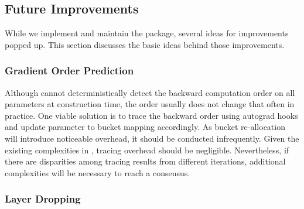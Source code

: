 \subsection{Future Improvements}

While we implement and maintain the  package, several ideas for improvements popped up. This section discusses the basic ideas behind those improvements. 



\subsubsection{Gradient Order Prediction}

Although  cannot deterministically detect the backward computation order on all parameters at construction time, the order usually does not change that often in practice. One viable solution is to trace the backward order using autograd hooks and update parameter to bucket mapping accordingly. As bucket re-allocation will introduce noticeable overhead, it should be conducted infrequently. Given the existing complexities in , tracing overhead should be negligible. Nevertheless, if there are disparities among tracing results from different iterations, additional complexities will be necessary to reach a consensus. 

\subsubsection{Layer Dropping}

